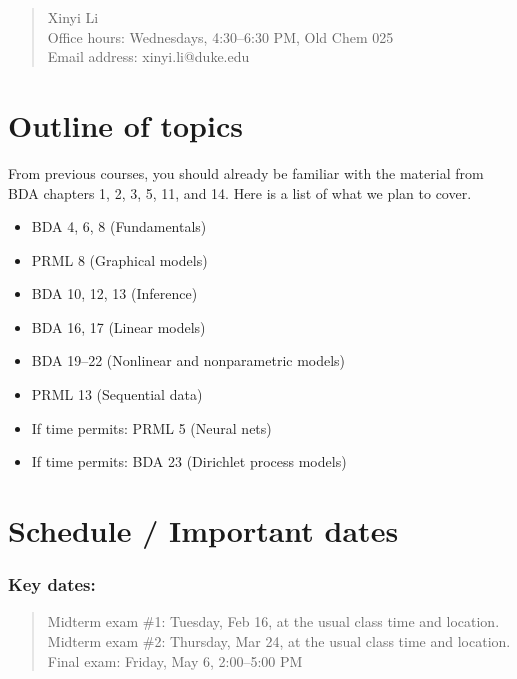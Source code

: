 \documentclass[12pt]{article}
\begin{document}
\begin{quote}
Xinyi Li \\
Office hours: Wednesdays, 4:30--6:30 PM, Old Chem 025 \\
Email address: xinyi.li@duke.edu
\end{quote}

\newpage

\section{Outline of topics}

From previous courses, you should already be familiar with the material from BDA chapters 1, 2, 3, 5, 11, and 14.
Here is a list of what we plan to cover.

\begin{itemize}
    \item BDA 4, 6, 8 (Fundamentals)
    \item PRML 8 (Graphical models)
    \item BDA 10, 12, 13 (Inference)
    \item BDA 16, 17 (Linear models)
    \item BDA 19--22 (Nonlinear and nonparametric models)
    \item PRML 13 (Sequential data)
    \item If time permits: PRML 5 (Neural nets)
    \item If time permits: BDA 23 (Dirichlet process models)
\end{itemize}


\section{Schedule / Important dates}

\subsubsection*{Key dates:}
\begin{quote}
Midterm exam \#1: Tuesday, Feb 16, at the usual class time and location. \\
Midterm exam \#2: Thursday, Mar 24, at the usual class time and location. \\
Final exam: Friday, May 6, 2:00--5:00 PM
\end{quote}
\end{document}
